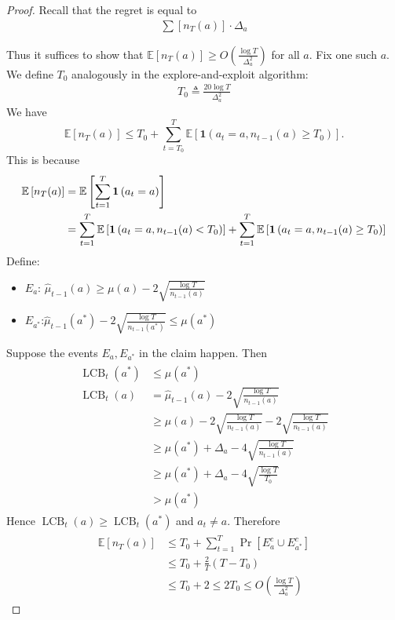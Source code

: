 \documentclass{article}
\begin{document}
\begin{proof}
Recall that the regret is equal to
\begin{align*}
\sum\left[n_{T}(a)\right] \cdot \Delta_a
\end{align*}

Thus it suffices to show that $\mathbb{E}\left[n_{T}(a)\right] \geq O\left(\frac{\log T}{\Delta_a^{2}}\right)$ for all $a$. Fix one such $a$. We define $T_{0}$ analogously in the explore-and-exploit algorithm:
\begin{align*}
T_{0} \triangleq \frac{20 \log T}{\Delta_a^{2}}
\end{align*}
We have 
$$
 \mathbb{E}\left[n_{T}(a)\right] \leq T_{0}+\sum_{t=T_{0}}^{T} \mathbb{E}\left[\mathbf{1}\left(a_{t}=a, n_{t-1}(a) \geq T_{0}\right)\right].
$$
This is because
\begin{align*}
\begin{aligned}
\mathbb{E}\left[n_{T}(a)\right] &=\mathbb{E}\left[\sum_{t=1}^{T} \mathbf{1}\left(a_{t}=a\right)\right] \\
&=\sum_{t=1}^{T} \mathbb{E}\left[\mathbf{1}\left(a_{t}=a, n_{t-1}(a)<T_{0}\right)\right]+\sum_{t=1}^{T} \E\left[\mathbf{1}\left(a_{t}=a, n_{t-1}(a) \geq T_{0}\right)\right]
\end{aligned}
\end{align*}
Define:
\begin{itemize}
    \item $E_{a}$: $\hat{\mu}_{t-1}(a) \geq \mu(a)-2 \sqrt{\frac{\log T}{n_{t-1}(a)}}$
    \item $E_{a^{*}}$:$\hat{\mu}_{t-1}(a^*) -2 \sqrt{\frac{\log T}{n_{t-1}(a^*)}} \le \mu(a^*)$
\end{itemize}
Suppose the events $E_{a}, E_{a^{*}}$ in the claim happen. Then
\begin{align*}
\begin{aligned}
\operatorname{LCB}_{t}\left(a^{*}\right) & \leq \mu\left(a^{*}\right) \\
\operatorname{LCB}_{t}(a) &=\hat{\mu}_{t-1}(a)-2 \sqrt{\frac{\log T}{n_{t-1}(a)}} \\
& \geq \mu(a)-2 \sqrt{\frac{\log T}{n_{t-1}(a)}}-2 \sqrt{\frac{\log T}{n_{t-1}(a)}} \\
& \geq \mu\left(a^{*}\right)+\Delta_a-4 \sqrt{\frac{\log T}{n_{t-1}(a)}} \\
& \geq \mu\left(a^{*}\right)+\Delta_a-4 \sqrt{\frac{\log T}{T_{0}}} \\
&>\mu\left(a^{*}\right)
\end{aligned}
\end{align*}
Hence $\operatorname{LCB}_{t}(a) \geq \operatorname{LCB}_{t}\left(a^{*}\right)$ and $a_{t} \neq a$. Therefore
\begin{align*}
\begin{aligned}
\mathbb{E}\left[n_{T}(a)\right] & \leq T_{0}+\sum_{t=1}^{T} \operatorname{Pr}\left[E_{a}^c \cup E_{a^{*}}^c\right] \\
& \leq T_{0}+\frac{2}{T}\left(T-T_{0}\right) \\
& \leq T_{0}+2 \leq 2 T_{0} \leq O\left(\frac{\log T}{\Delta_a^{2}}\right)
\end{aligned}
\end{align*}
\end{proof}
\end{document}
